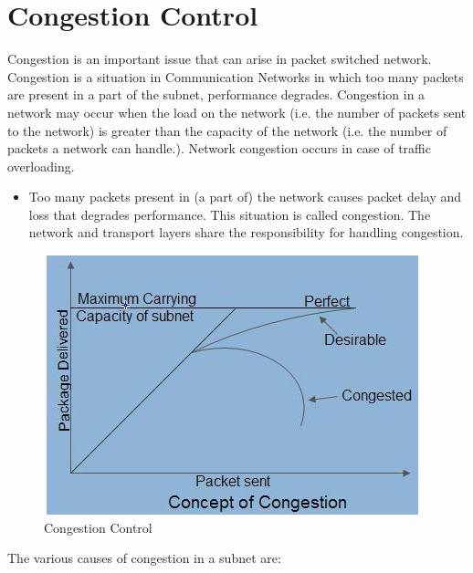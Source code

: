 \documentclass[twoside]{article}
\begin{document}
\section*{Congestion Control}
Congestion is an important issue that can arise in packet switched network. Congestion is a situation in Communication Networks in which too many packets are present in a part of the subnet, performance degrades. Congestion in a network may occur when the load on the network (i.e. the number of packets sent to the network) is greater than the capacity of the network (i.e. the number of packets a network can handle.). Network congestion occurs in case of traffic overloading.
\begin{itemize}
    \item Too many packets present in (a part of) the network causes packet delay
and loss that degrades performance. This situation is called congestion.
The network and transport layers share the responsibility for handling
congestion.
\end{itemize}
\newpage  \begin{figure}
    \centering
    \includegraphics[width=\textwidth]{images/cc2.png}
    \caption{Congestion Control}
\end{figure}
\newpage
\newline The various causes of congestion in a subnet are:
\end{document}
